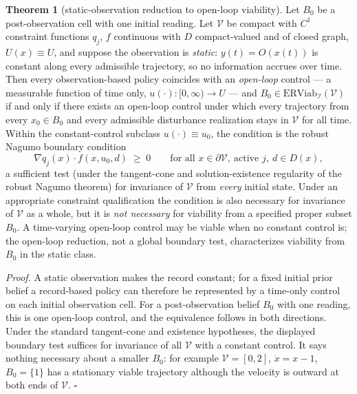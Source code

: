 \documentclass[10pt,twocolumn]{article}
\theoremstyle{definition}
\newtheorem{theorem}{Theorem}
\begin{document}
\begin{theorem}[static-observation reduction to open-loop viability]\label{calc-thm:static-complete}
Let \(B_0\) be a post-observation cell with one initial reading. Let \(\mathcal{V}\) be compact with \(C^{1}\) constraint functions \(q_{j}\), \(f\) continuous with \(D\) compact-valued and of closed graph, \(U(x) \equiv U\), and suppose the observation is \emph{static}: \(y(t) = O(x(t))\) is constant along every admissible trajectory, so no information accrues over time. Then every observation-based policy coincides with an \emph{open-loop} control --- a measurable function of time only, \(u(\cdot):[0,\infty)\to U\) --- and \(B_{0} \in \mathrm{ERViab}_{\mathcal{I}}(\mathcal{V})\) if and only if there exists an open-loop control under which every trajectory from every \(x_{0} \in B_{0}\) and every admissible disturbance realization stays in \(\mathcal{V}\) for all time. Within the constant-control subclass \(u(\cdot) \equiv u_{0}\), the condition is the robust Nagumo boundary condition
\[
\nabla q_{j}(x) \cdot f(x, u_{0}, d) \;\ge\; 0
\qquad \text{for all } x \in \partial\mathcal{V},\ \text{active } j,\ d \in D(x),
\]
a sufficient test (under the tangent-cone and solution-existence regularity of the robust Nagumo theorem) for invariance of \(\mathcal V\) from \emph{every} initial state. Under an appropriate constraint qualification the condition is also necessary for invariance of \(\mathcal V\) as a whole, but it is \emph{not necessary} for viability from a specified proper subset \(B_0\). A time-varying open-loop control may be viable when no constant control is; the open-loop reduction, not a global boundary test, characterizes viability from \(B_0\) in the static class.
\end{theorem}

\emph{Proof.} A static observation makes the record constant;
for a fixed initial prior belief a record-based policy can therefore be
represented by a time-only control on each initial observation cell.
For a post-observation belief \(B_0\) with one reading, this is one
open-loop control, and the equivalence follows in both directions.
Under the standard tangent-cone and existence hypotheses, the displayed
boundary test suffices for invariance of all \(\mathcal V\) with a
constant control. It says nothing necessary about a smaller \(B_0\):
for example \(\mathcal V=[0,2]\), \(\dot x=x-1\),
\(B_0=\{1\}\) has a stationary viable trajectory although the
velocity is outward at both ends of \(\mathcal V\). \hfill\(\square\)
\end{document}
